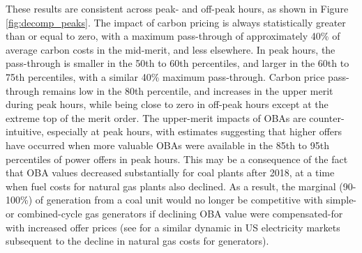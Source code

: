\documentclass[12pt]{article}
\begin{document}
These results are consistent across peak- and off-peak hours, as shown in Figure \ref{fig:decomp_peaks}. The impact of carbon pricing is always statistically greater than or equal to zero, with a maximum pass-through of approximately 40\% of average carbon costs in the mid-merit, and less elsewhere. In peak hours, the pass-through is smaller in the 50th to 60th percentiles, and larger in the 60th to 75th percentiles, with a similar 40\% maximum pass-through. Carbon price pass-through remains low in the 80th percentile, and increases in the upper merit during peak hours, while being close to zero in off-peak hours except at the extreme top of the merit order. The upper-merit impacts of OBAs are counter-intuitive, especially at peak hours, with estimates suggesting that higher offers have occurred when more valuable OBAs were available in the 85th to 95th percentiles of power offers in peak hours. This may be a consequence of the fact that OBA values decreased substantially for coal plants after 2018, at a time when fuel costs for natural gas plants also declined. As a result, the marginal (90-100\%) of generation from a coal unit would no longer be competitive with simple- or combined-cycle gas generators if declining OBA value were compensated-for with increased offer prices (see \cite{cullen_mansur} for a similar dynamic in US electricity markets subsequent to the decline in natural gas costs for generators).
\end{document}
